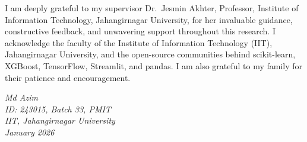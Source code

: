 I am deeply grateful to my supervisor Dr.\ Jesmin Akhter, Professor, Institute of Information Technology, Jahangirnagar University, for her invaluable guidance, constructive feedback, and unwavering support throughout this research. I acknowledge the faculty of the Institute of Information Technology (IIT), Jahangirnagar University, and the open-source communities behind scikit-learn, XGBoost, TensorFlow, Streamlit, and pandas. I am also grateful to my family for their patience and encouragement.
\par\vspace{1.5em}
\begin{flushright}\textit{Md Azim}\\\textit{ID: 243015, Batch 33, PMIT}\\\textit{IIT, Jahangirnagar University}\\\textit{January 2026}\end{flushright}

